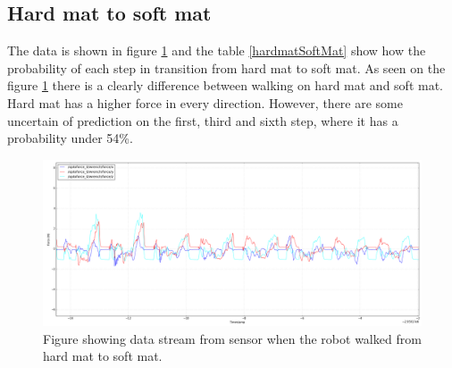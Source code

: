 \documentclass[USenglish]{ifimaster}  %
\begin{document}
	\FloatBarrier
	\clearpage
\subsection{Hard mat to soft mat} \label{sec:hmssm}
The data is shown in figure \ref{fig:hardmatSoftMat} and the table \ref{hardmatSoftMat} show how the probability of each step in transition from hard mat to soft mat. As seen on the figure \ref{fig:hardmatSoftMat} there is a clearly difference between walking on hard mat and soft mat. Hard mat has a higher force in every direction. However, there are some uncertain of prediction on the first, third and sixth step, where it has a probability under 54\%. 
	
	
	\begin{figure}[h]
		\centering
		\includegraphics[width=\textwidth,height=\textheight,keepaspectratio]{Figures/MB3MM}
		\caption{Figure showing data stream from sensor when the robot walked from hard mat to soft mat.}
		\label{fig:hardmatSoftMat}
	\end{figure}
	
	\begin{table}[h]
		\centering
		\caption{The table showing probability of each terrain per step walking from hard mat to soft mat. Marked green represent correct prediction and correct terrain, red represent wrong prediction and yellow is the correct prediction if it got wrong.}
		\label{hardmatSoftMat}
	\end{table}
	\FloatBarrier
	\clearpage
	
\end{document}
